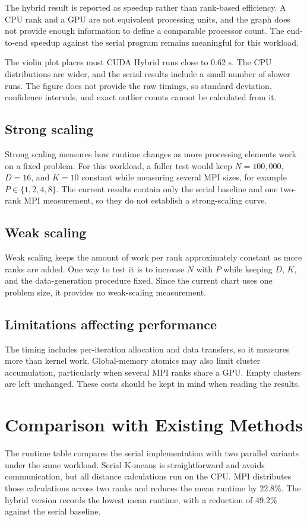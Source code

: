 \documentclass[conference]{IEEEtran}
\begin{document}
The hybrid result is reported as speedup rather than rank-based efficiency. A CPU rank and a GPU are not equivalent processing units, and the graph does not provide enough information to define a comparable processor count. The end-to-end speedup against the serial program remains meaningful for this workload.

The violin plot places most CUDA Hybrid runs close to 0.62 s. The CPU distributions are wider, and the serial results include a small number of slower runs. The figure does not provide the raw timings, so standard deviation, confidence intervals, and exact outlier counts cannot be calculated from it.

\subsection{Strong scaling}
Strong scaling measures how runtime changes as more processing elements work on a fixed problem. For this workload, a fuller test would keep $N=100{,}000$, $D=16$, and $K=10$ constant while measuring several MPI sizes, for example $P\in\{1,2,4,8\}$. The current results contain only the serial baseline and one two-rank MPI measurement, so they do not establish a strong-scaling curve.

\subsection{Weak scaling}
Weak scaling keeps the amount of work per rank approximately constant as more ranks are added. One way to test it is to increase $N$ with $P$ while keeping $D$, $K$, and the data-generation procedure fixed. Since the current chart uses one problem size, it provides no weak-scaling measurement.

\subsection{Limitations affecting performance}
The timing includes per-iteration allocation and data transfers, so it measures more than kernel work. Global-memory atomics may also limit cluster accumulation, particularly when several MPI ranks share a GPU. Empty clusters are left unchanged. These costs should be kept in mind when reading the results.

\section{Comparison with Existing Methods}
\label{sec:comparison}
The runtime table compares the serial implementation with two parallel variants under the same workload. Serial K-means is straightforward and avoids communication, but all distance calculations run on the CPU. MPI distributes those calculations across two ranks and reduces the mean runtime by 22.8\%. The hybrid version records the lowest mean runtime, with a reduction of 49.2\% against the serial baseline.
\end{document}

